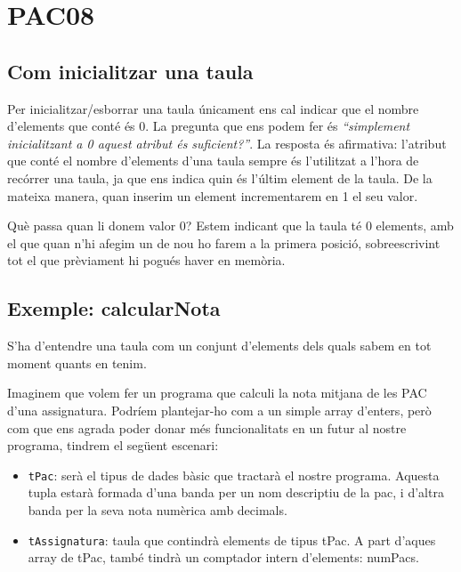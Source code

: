 \documentclass[
]{book}
\providecommand{\tightlist}{%
  \setlength{\itemsep}{0pt}\setlength{\parskip}{0pt}}
\begin{document}
\hypertarget{pac08}{%
\chapter{PAC08}\label{pac08}}

\hypertarget{com-inicialitzar-una-taula}{%
\section{Com inicialitzar una taula}\label{com-inicialitzar-una-taula}}

Per inicialitzar/esborrar una taula únicament ens cal indicar que el nombre d'elements que conté és 0.
La pregunta que ens podem fer és \emph{``simplement inicialitzant a 0 aquest atribut és suficient?''}. La resposta és afirmativa: l'atribut que conté el nombre d'elements d'una taula sempre és l'utilitzat a l'hora de recórrer una taula, ja que ens indica quin és l'últim element de la taula. De la mateixa manera, quan inserim un element incrementarem en 1 el seu valor.

Què passa quan li donem valor 0? Estem indicant que la taula té 0 elements, amb el que quan n'hi afegim un de nou ho farem a la primera posició, sobreescrivint tot el que prèviament hi pogués haver en memòria.

\hypertarget{exemple-calcularnota}{%
\section{Exemple: calcularNota}\label{exemple-calcularnota}}

S'ha d'entendre una taula com un conjunt d'elements dels quals sabem en tot moment quants en tenim.

Imaginem que volem fer un programa que calculi la nota mitjana de les PAC d'una assignatura. Podríem plantejar-ho com a un simple array d'enters, però com que ens agrada poder donar més funcionalitats en un futur al nostre programa, tindrem el següent escenari:

\begin{itemize}
\tightlist
\item
  \texttt{tPac}: serà el tipus de dades bàsic que tractarà el nostre programa. Aquesta tupla estarà formada d'una banda per un nom descriptiu de la pac, i d'altra banda per la seva nota numèrica amb decimals.
\item
  \texttt{tAssignatura}: taula que contindrà elements de tipus tPac. A part d'aques array de tPac, també tindrà un comptador intern d'elements: numPacs.
\end{itemize}
\end{document}
